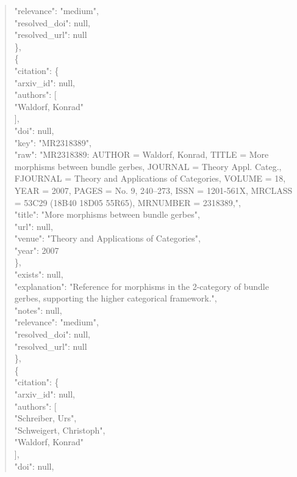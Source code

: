 \documentclass[11pt]{article}
\begin{document}
\begin{quote}
      "relevance": "medium",\\
      "resolved\_doi": null,\\
      "resolved\_url": null\\
    \},\\
    \{\\
      "citation": \{\\
        "arxiv\_id": null,\\
        "authors": [\\
          "Waldorf, Konrad"\\
        ],\\
        "doi": null,\\
        "key": "MR2318389",\\
        "raw": "MR2318389: AUTHOR = Waldorf, Konrad, TITLE = More morphisms between bundle gerbes, JOURNAL = Theory Appl. Categ., FJOURNAL = Theory and Applications of Categories, VOLUME = 18, YEAR = 2007, PAGES = No. 9, 240--273, ISSN = 1201-561X, MRCLASS = 53C29 (18B40 18D05 55R65), MRNUMBER = 2318389,",\\
        "title": "More morphisms between bundle gerbes",\\
        "url": null,\\
        "venue": "Theory and Applications of Categories",\\
        "year": 2007\\
      \},\\
      "exists": null,\\
      "explanation": "Reference for morphisms in the 2-category of bundle gerbes, supporting the higher categorical framework.",\\
      "notes": null,\\
      "relevance": "medium",\\
      "resolved\_doi": null,\\
      "resolved\_url": null\\
    \},\\
    \{\\
      "citation": \{\\
        "arxiv\_id": null,\\
        "authors": [\\
          "Schreiber, Urs",\\
          "Schweigert, Christoph",\\
          "Waldorf, Konrad"\\
        ],\\
        "doi": null,\\

\end{quote}
\end{document}
